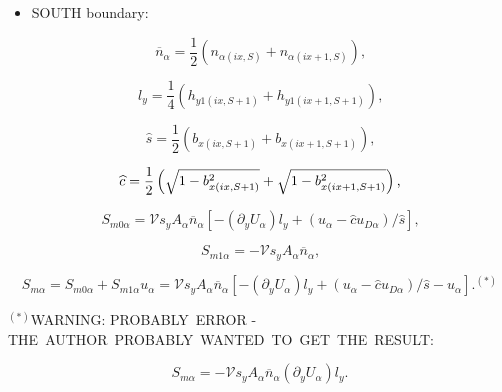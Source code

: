 \documentclass[11pt]{article}
\begin{document}
\bigskip

\begin{itemize}
\item  SOUTH boundary:
\end{itemize}

\begin{equation}
\overline{n}_{\alpha}=\frac{1}{2}\left( n_{\alpha\left( ix,S\right)
}+n_{\alpha\left( ix+1,S\right) }\right) \text{,}   \label{c86}
\end{equation}

\begin{equation}
l_{y}=\frac{1}{4}\left( h_{y1\left( ix,S+1\right) }+h_{y1\left(
ix+1,S+1\right) }\right) \text{,}   \label{c87}
\end{equation}

\begin{equation}
\widehat{s}=\frac{1}{2}\left( b_{x\left( ix,S+1\right) }+b_{x\left(
ix+1,S+1\right) }\right) \text{,}   \label{c88}
\end{equation}

\begin{equation}
\widehat{c}=\frac{1}{2}\left( \sqrt{1-b_{x\left( ix,S+1\right) }^{2}}+\sqrt{%
1-b_{x\left( ix+1,S+1\right) }^{2}}\right) \text{,}   \label{c89}
\end{equation}

\begin{equation}
S_{m0\alpha}=\mathcal{V}s_{y}A_{\alpha}\overline{n}_{\alpha}\left[ -\left(
\partial_{y}U_{\alpha}\right) l_{y}+\left( u_{\alpha}-\widehat{c}u_{D\alpha
}\right) /\widehat{s}\right] \text{,}   \label{c90}
\end{equation}

\begin{equation}
S_{m1\alpha}=-\mathcal{V}s_{y}A_{\alpha}\overline{n}_{\alpha}\text{,} 
\label{c91}
\end{equation}

\begin{equation}
S_{m\alpha}=S_{m0\alpha}+S_{m1\alpha}u_{\alpha}=\mathcal{V}s_{y}A_{\alpha }%
\overline{n}_{\alpha}\left[ -\left( \partial_{y}U_{\alpha}\right)
l_{y}+\left( u_{\alpha}-\widehat{c}u_{D\alpha}\right) /\widehat{s}-u_{\alpha}%
\right] \text{.}^{\left( \ast\right) }   \label{c92}
\end{equation}

\bigskip

$^{\left( \ast\right) }$WARNING: PROBABLY\ ERROR - THE\ AUTHOR\ PROBABLY\
WANTED\ TO\ GET\ THE\ RESULT:

\begin{equation*}
S_{m\alpha}=-\mathcal{V}s_{y}A_{\alpha}\overline{n}_{\alpha}\left(
\partial_{y}U_{\alpha}\right) l_{y}\text{.}
\end{equation*}
\end{document}
